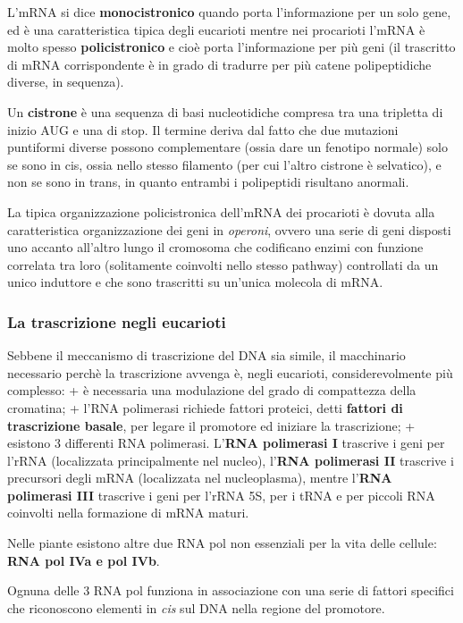 \documentclass[]{article}
\begin{document}
L'mRNA si dice \textbf{monocistronico} quando porta l'informazione per
un solo gene, ed è una caratteristica tipica degli eucarioti mentre nei
procarioti l'mRNA è molto spesso \textbf{policistronico} e cioè porta
l'informazione per più geni (il trascritto di mRNA corrispondente è in
grado di tradurre per più catene polipeptidiche diverse, in sequenza).

Un \textbf{cistrone} è una sequenza di basi nucleotidiche compresa tra
una tripletta di inizio AUG e una di stop. Il termine deriva dal fatto
che due mutazioni puntiformi diverse possono complementare (ossia dare
un fenotipo normale) solo se sono in cis, ossia nello stesso filamento
(per cui l'altro cistrone è selvatico), e non se sono in trans, in
quanto entrambi i polipeptidi risultano anormali.

La tipica organizzazione policistronica dell'mRNA dei procarioti è
dovuta alla caratteristica organizzazione dei geni in \emph{operoni},
ovvero una serie di geni disposti uno accanto all'altro lungo il
cromosoma che codificano enzimi con funzione correlata tra loro
(solitamente coinvolti nello stesso pathway) controllati da un unico
induttore e che sono trascritti su un'unica molecola di mRNA.

\subsubsection{La trascrizione negli
eucarioti}\label{la-trascrizione-negli-eucarioti}

Sebbene il meccanismo di trascrizione del DNA sia simile, il macchinario
necessario perchè la trascrizione avvenga è, negli eucarioti,
considerevolmente più complesso: + è necessaria una modulazione del
grado di compattezza della cromatina; + l'RNA polimerasi richiede
fattori proteici, detti \textbf{fattori di trascrizione basale}, per
legare il promotore ed iniziare la trascrizione; + esistono 3 differenti
RNA polimerasi. L'\textbf{RNA polimerasi I} trascrive i geni per l'rRNA
(localizzata principalmente nel nucleo), l'\textbf{RNA polimerasi II}
trascrive i precursori degli mRNA (localizzata nel nucleoplasma), mentre
l'\textbf{RNA polimerasi III} trascrive i geni per l'rRNA 5S, per i tRNA
e per piccoli RNA coinvolti nella formazione di mRNA maturi.

Nelle piante esistono altre due RNA pol non essenziali per la vita delle
cellule: \textbf{RNA pol IVa e pol IVb}.

Ognuna delle 3 RNA pol funziona in associazione con una serie di fattori
specifici che riconoscono elementi in \emph{cis} sul DNA nella regione
del promotore.
\end{document}
